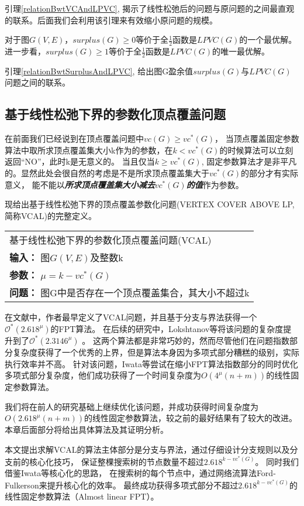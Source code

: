 引理\ref{relationBwtVCAndLPVC}, 揭示了线性松弛后的问题与原问题的之间最直观的联系。后面我们会利用该引理来有效缩小原问题的规模。

\begin{lemma}\label{relationBwtSurplusAndLPVC}
对于图$G(V, E)$，$surplus(G) \ge 0$等价于全$\frac{1}{2}$函数是$LPVC(G)$的一个最优解。
进一步看，$surplus(G) \ge 1$等价于全$\frac{1}{2}$函数是$LPVC(G)$的唯一最优解。
\end{lemma}

引理\ref{relationBwtSurplusAndLPVC}, 给出图G盈余值$surplus(G)$与$LPVC(G)$问题之间的联系。


\subsection{基于线性松弛下界的参数化顶点覆盖问题}
在前面我们已经说到在顶点覆盖问题中$vc(G)\ge vc^*(G)$，
当顶点覆盖固定参数算法中取所求顶点覆盖集大小k作为的参数，在$k < vc^*(G)$的时候算法可以立刻返回“NO”，此时k是无意义的。
当且仅当$k \ge vc^*(G)$, 固定参数算法才是非平凡的。显然此处会很自然的考虑是不是所求顶点覆盖集大于$vc^*(G)$的部分才有实际意义，
能不能以\textbf{\emph{所求顶点覆盖集大小减去$vc^*(G)$的值}}作为参数。

现给出基于线性松弛下界的顶点覆盖参数化问题(VERTEX COVER ABOVE LP, 简称VCAL)的完整定义。\\

\begin{tabular}{| p{0.9\headwidth} |}
  \hline
  基于线性松弛下界的参数化顶点覆盖问题(VCAL) \\
  \textbf{输入：} 图$G(V, E)$及整数k \\
  \textbf{参数：} $\mu = k - vc^*(G)$\\
  \textbf{问题：} 图G中是否存在一个顶点覆盖集合，其大小不超过k\\
  \hline
\end{tabular} \vspace{0.5cm}


在文献\cite{narayanaswamy2012lp}中，作者最早定义了VCAL问题，并且基于分支与界法获得一个$\mathcal{O}^*(2.618^{\mu})$的FPT算法。
在后续的研究中，Lokshtanov等将该问题的复杂度提升到了$\mathcal{O}^*(2.3146^{\mu})$ 。
这两个算法都是非常巧妙的，然而尽管他们在问题指数部分复杂度获得了一个优秀的上界，但是算法本身因为多项式部分糟糕的级别，实际执行效率并不高。
针对该问题，Iwata等尝试在缩小FPT算法指数部分的同时优化多项式部分复杂度，他们成功获得了一个时间复杂度为$O(4^{\mu}(n+m))$的线性固定参数算法。

我们将在前人的研究基础上继续优化该问题，并成功获得时间复杂度为$O(2.618^{\mu}(n+m))$的线性固定参数算法，较之前的最好结果有了较大的改进。
本章后面部分将给出具体算法及其证明分析。

本文提出求解VCAL的算法主体部分是分支与界法，通过仔细设计分支规则以及分支前的核心化技巧，
保证整棵搜索树的节点数量不超过$2.618^{k-vc^*(G)}$。
同时我们借鉴Iwata等核心化的思路，
在搜索树的每个节点中，通过网络流算法Ford-Fulkerson来提升核心化的效率。
最终成功获得多项式部分不超过$2.618^{k-vc^*(G)}$的线性固定参数算法（Almost linear FPT）。
